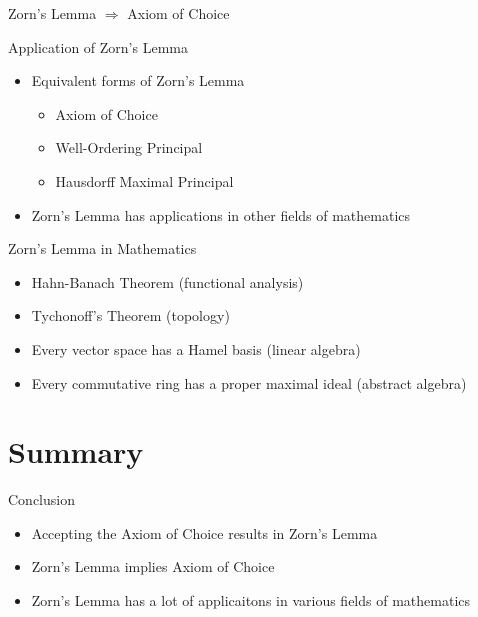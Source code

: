 \documentclass{beamer}
\begin{document}
\begin{frame}{Zorn's Lemma $\Rightarrow$ Axiom of Choice}
\end{frame}

\begin{frame}{Application of Zorn's Lemma}
    \begin{itemize}
        \item Equivalent forms of Zorn's Lemma
        \begin{itemize}
            \item Axiom of Choice
            \item Well-Ordering Principal
            \item Hausdorff Maximal Principal
        \end{itemize}
        \item Zorn's Lemma has applications in other fields of mathematics
    \end{itemize}
\end{frame}

\begin{frame}{Zorn's Lemma in Mathematics}
    \begin{itemize}
        \item Hahn-Banach Theorem (functional analysis)
        \item Tychonoff's Theorem (topology)
        \item Every vector space has a Hamel basis (linear algebra)
        \item Every commutative ring has a proper maximal ideal (abstract algebra)
    \end{itemize}
  
\end{frame}

\section*{Summary}

\begin{frame}{Conclusion}
  \begin{itemize}
  \item
    Accepting the Axiom of Choice results in Zorn's Lemma
  \item
    Zorn's Lemma implies Axiom of Choice
  \item
    Zorn's Lemma has a lot of applicaitons in various fields of mathematics
  \end{itemize}

\end{frame}
\end{document}
